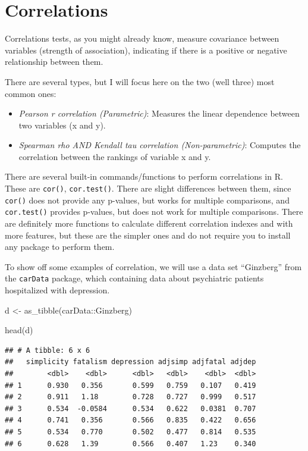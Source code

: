\documentclass[
]{book}
\newenvironment{Shaded}{\begin{snugshade}}{\end{snugshade}}
\newcommand{\FunctionTok}[1]{\textcolor[rgb]{0.00,0.00,0.00}{#1}}
\newcommand{\NormalTok}[1]{#1}
\newcommand{\OtherTok}[1]{\textcolor[rgb]{0.56,0.35,0.01}{#1}}
\newcommand{\SpecialCharTok}[1]{\textcolor[rgb]{0.00,0.00,0.00}{#1}}
\begin{document}
\hypertarget{correlations}{%
\section{Correlations}\label{correlations}}

Correlations tests, as you might already know, measure covariance between variables (strength of association), indicating if there is a positive or negative relationship between them.

There are several types, but I will focus here on the two (well three) most common ones:

\begin{itemize}
\item
  \emph{Pearson r correlation (Parametric)}: Measures the linear dependence between two variables (x and y).\\
\item
  \emph{Spearman rho AND Kendall tau correlation (Non-parametric)}: Computes the correlation between the rankings of variable x and y.\\
\end{itemize}

There are several built-in commands/functions to perform correlations in R. These are \texttt{cor()}, \texttt{cor.test()}. There are slight differences between them, since \texttt{cor()} does not provide any p-values, but works for multiple comparisons, and \texttt{cor.test()} provides p-values, but does not work for multiple comparisons. There are definitely more functions to calculate different correlation indexes and with more features, but these are the simpler ones and do not require you to install any package to perform them.

To show off some examples of correlation, we will use a data set ``Ginzberg'' from the \texttt{carData} package, which containing data about psychiatric patients hospitalized with depression.

\begin{Shaded}
\begin{Highlighting}[]
\NormalTok{d }\OtherTok{\textless{}{-}} \FunctionTok{as\_tibble}\NormalTok{(carData}\SpecialCharTok{::}\NormalTok{Ginzberg)}

\FunctionTok{head}\NormalTok{(d)}
\end{Highlighting}
\end{Shaded}

\begin{verbatim}
## # A tibble: 6 x 6
##   simplicity fatalism depression adjsimp adjfatal adjdep
##        <dbl>    <dbl>      <dbl>   <dbl>    <dbl>  <dbl>
## 1      0.930   0.356       0.599   0.759   0.107   0.419
## 2      0.911   1.18        0.728   0.727   0.999   0.517
## 3      0.534  -0.0584      0.534   0.622   0.0381  0.707
## 4      0.741   0.356       0.566   0.835   0.422   0.656
## 5      0.534   0.770       0.502   0.477   0.814   0.535
## 6      0.628   1.39        0.566   0.407   1.23    0.340
\end{verbatim}
\end{document}
